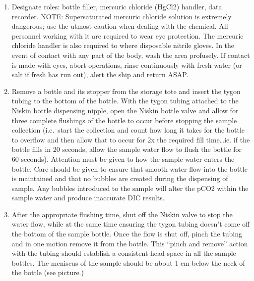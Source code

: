\documentclass[
]{book}
\providecommand{\tightlist}{%
  \setlength{\itemsep}{0pt}\setlength{\parskip}{0pt}}
\begin{document}
\begin{enumerate}
\def\labelenumi{\arabic{enumi}.}
\tightlist
\item
  Designate roles: bottle filler, mercuric chloride (HgCl2) handler, data recorder. NOTE: Supersaturated mercuric chloride solution is extremely dangerous; use the utmost caution when dealing with the chemical. All personnel working with it are required to wear eye protection. The mercuric chloride handler is also required to where disposable nitrile gloves. In the event of contact with any part of the body, wash the area profusely. If contact is made with eyes, abort operations, rinse continuously with fresh water (or salt if fresh has run out), alert the ship and return ASAP.
\item
  Remove a bottle and its stopper from the storage tote and insert the tygon tubing to the bottom of the bottle. With the tygon tubing attached to the Niskin bottle dispensing nipple, open the Niskin bottle valve and allow for three complete flushings of the bottle to occur before stopping the sample collection (i.e.~start the collection and count how long it takes for the bottle to overflow and then allow that to occur for 2x the required fill time\ldots ie. if the bottle fills in 20 seconds, allow the sample water flow to flush the bottle for 60 seconds). Attention must be given to how the sample water enters the bottle. Care should be given to ensure that smooth water flow into the bottle is maintained and that no bubbles are created during the dispensing of sample. Any bubbles introduced to the sample will alter the pCO2 within the sample water and produce inaccurate DIC results.
\item
  After the appropriate flushing time, shut off the Niskin valve to stop the water flow, while at the same time ensuring the tygon tubing doesn't come off the bottom of the sample bottle. Once the flow is shut off, pinch the tubing and in one motion remove it from the bottle. This ``pinch and remove'' action with the tubing should establish a consistent head-space in all the sample bottles. The meniscus of the sample should be about 1 cm below the neck of the bottle (see picture.)
\end{enumerate}
\end{document}
